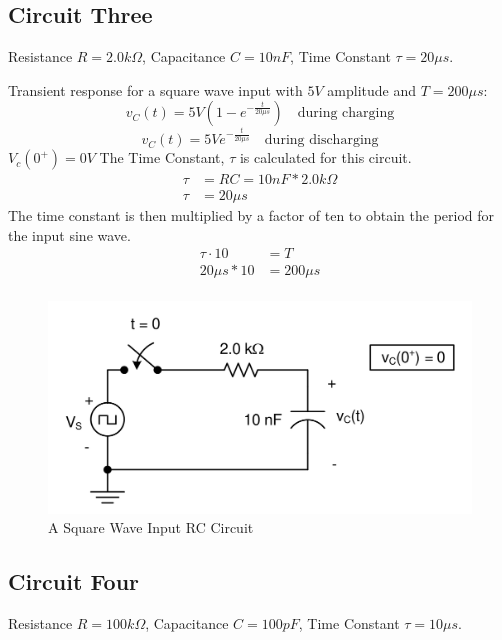 \documentclass[12pt]{article}
\begin{document}
\subsection{Circuit Three}
Resistance $R = 2.0k\Omega$, Capacitance $C = 10nF$, Time Constant $\tau = 20\mu s$.

Transient response for a square wave input with $5V$ amplitude and $T = 200\mu s$:
\[
	v_C(t) = 5V(1 - e^{-\frac{t}{20\mu s}}) \quad \text{during charging}
\]
\[
	v_C(t) = 5V e^{-\frac{t}{20\mu s}} \quad \text{during discharging}
\]
$V_c(0^+) = 0V$
The Time Constant, $\tau$ is calculated for this circuit.
\begin{align*}
	\tau & = RC = 10nF * 2.0k\Omega \\
	\tau & = 20\mu s
\end{align*}
The time constant is then multiplied by a factor of ten to obtain the period for
the input sine wave.
\begin{align*}
	\tau \cdot 10 & = T        \\
	20\mu s * 10  & = 200\mu s \\
\end{align*}
\begin{figure}[H]
	\centering
	\includegraphics[width=14cm]{e5_3}
	\caption{A Square Wave Input RC Circuit}
\end{figure}
\subsection{Circuit Four}
Resistance $R = 100k\Omega$, Capacitance $C = 100pF$, Time Constant $\tau = 10\mu s$.
\end{document}
